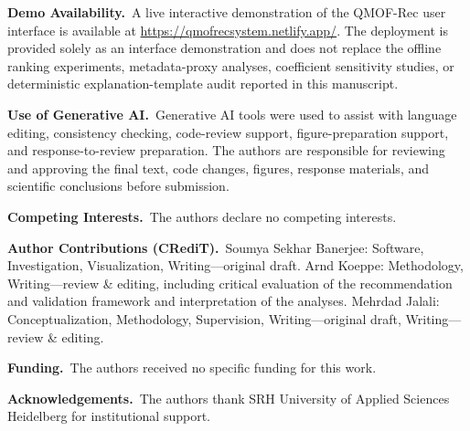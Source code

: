 \documentclass[12pt,a4paper]{article}
\begin{document}
\noindent\textbf{Demo Availability.}\ A live interactive demonstration of the QMOF-Rec user interface is available at \url{https://qmofrecsystem.netlify.app/}. The deployment is provided solely as an interface demonstration and does not replace the offline ranking experiments, metadata-proxy analyses, coefficient sensitivity studies, or deterministic explanation-template audit reported in this manuscript.

\noindent\textbf{Use of Generative AI.}\ Generative AI tools were used to assist with language editing, consistency checking, code-review support, figure-preparation support, and response-to-review preparation. The authors are responsible for reviewing and approving the final text, code changes, figures, response materials, and scientific conclusions before submission.

\noindent\textbf{Competing Interests.}\ The authors declare no competing interests.

\noindent\textbf{Author Contributions (CRediT).}\ Soumya Sekhar Banerjee: Software, Investigation, Visualization, Writing---original draft. Arnd Koeppe: Methodology, Writing---review \& editing, including critical evaluation of the recommendation and validation framework and interpretation of the analyses. Mehrdad Jalali: Conceptualization, Methodology, Supervision, Writing---original draft, Writing---review \& editing.

\noindent\textbf{Funding.}\ The authors received no specific funding for this work.

\noindent\textbf{Acknowledgements.}\ The authors thank SRH University of Applied Sciences Heidelberg for institutional support.
\end{document}
